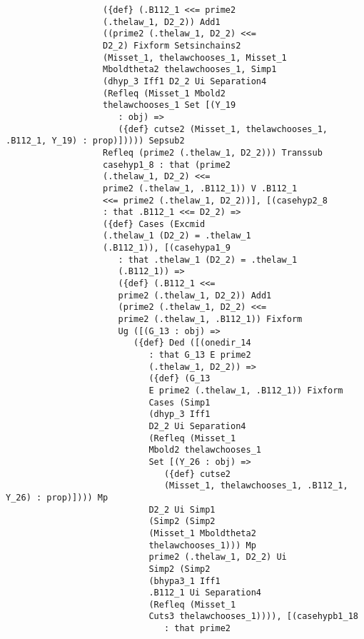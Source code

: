 \documentclass[12pt]{article}
\begin{document}
\begin{verbatim}
                   ({def} (.B112_1 <<= prime2 
                   (.thelaw_1, D2_2)) Add1 
                   ((prime2 (.thelaw_1, D2_2) <<= 
                   D2_2) Fixform Setsinchains2 
                   (Misset_1, thelawchooses_1, Misset_1 
                   Mboldtheta2 thelawchooses_1, Simp1 
                   (dhyp_3 Iff1 D2_2 Ui Separation4 
                   (Refleq (Misset_1 Mbold2 
                   thelawchooses_1 Set [(Y_19 
                      : obj) => 
                      ({def} cutse2 (Misset_1, thelawchooses_1, .B112_1, Y_19) : prop)])))) Sepsub2 
                   Refleq (prime2 (.thelaw_1, D2_2))) Transsub 
                   casehyp1_8 : that (prime2 
                   (.thelaw_1, D2_2) <<= 
                   prime2 (.thelaw_1, .B112_1)) V .B112_1 
                   <<= prime2 (.thelaw_1, D2_2))], [(casehyp2_8 
                   : that .B112_1 <<= D2_2) => 
                   ({def} Cases (Excmid 
                   (.thelaw_1 (D2_2) = .thelaw_1 
                   (.B112_1)), [(casehypa1_9 
                      : that .thelaw_1 (D2_2) = .thelaw_1 
                      (.B112_1)) => 
                      ({def} (.B112_1 <<= 
                      prime2 (.thelaw_1, D2_2)) Add1 
                      (prime2 (.thelaw_1, D2_2) <<= 
                      prime2 (.thelaw_1, .B112_1)) Fixform 
                      Ug ([(G_13 : obj) => 
                         ({def} Ded ([(onedir_14 
                            : that G_13 E prime2 
                            (.thelaw_1, D2_2)) => 
                            ({def} (G_13 
                            E prime2 (.thelaw_1, .B112_1)) Fixform 
                            Cases (Simp1 
                            (dhyp_3 Iff1 
                            D2_2 Ui Separation4 
                            (Refleq (Misset_1 
                            Mbold2 thelawchooses_1 
                            Set [(Y_26 : obj) => 
                               ({def} cutse2 
                               (Misset_1, thelawchooses_1, .B112_1, Y_26) : prop)]))) Mp 
                            D2_2 Ui Simp1 
                            (Simp2 (Simp2 
                            (Misset_1 Mboldtheta2 
                            thelawchooses_1))) Mp 
                            prime2 (.thelaw_1, D2_2) Ui 
                            Simp2 (Simp2 
                            (bhypa3_1 Iff1 
                            .B112_1 Ui Separation4 
                            (Refleq (Misset_1 
                            Cuts3 thelawchooses_1)))), [(casehypb1_18 
                               : that prime2 

\end{verbatim}
\end{document}
